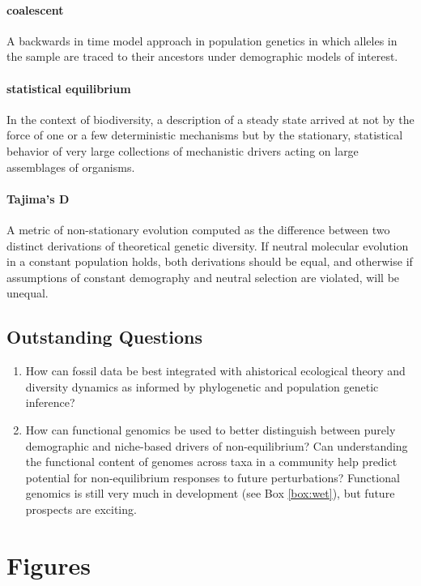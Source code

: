 \documentclass[12pt]{article}
\newcounter{Box}
\begin{document}
\paragraph{coalescent} A backwards in time model approach in
population genetics in which alleles in the sample are traced to their
ancestors under demographic models of interest.

\paragraph{statistical equilibrium} In the context of biodiversity, a
description of a steady state arrived at not by the force of one or a
few deterministic mechanisms but by the stationary, statistical
behavior of very large collections of mechanistic drivers acting on
large assemblages of organisms.

\paragraph{Tajima's D} A metric of non-stationary evolution computed
as the difference between two distinct derivations of theoretical
genetic diversity. If neutral molecular evolution in a constant
population holds, both derivations should be equal, and otherwise if
assumptions of constant demography and neutral selection are violated,
will be unequal.

\subsection*{Outstanding Questions}

\begin{enumerate}
\item How can fossil data be best integrated with ahistorical
  ecological theory and diversity dynamics as informed by phylogenetic
  and population genetic inference?
\item How can functional genomics be used to better distinguish
  between purely demographic and niche-based drivers of
  non-equilibrium? Can understanding the functional content of genomes
  across taxa in a community help predict potential for
  non-equilibrium responses to future perturbations? Functional
  genomics is still very much in development (see Box \ref{box:wet}),
  but future prospects are exciting.
\end{enumerate}

\pagebreak

\section*{Figures}
\end{document}
